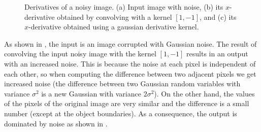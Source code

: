 \begin{figure}[h]
\centerline{
}
\caption{Derivatives of a noisy image. 
(a) Input image with noise, (b) its $x$-derivative obtained by convolving with a kernel $[1, -1]$, and (c) its $x$-derivative obtained using a gaussian derivative kernel.}
\label{fig:derivativesnoisystop}
\end{figure}

As shown in \fig{\ref{fig:derivativesnoisystop}}, the input is an image corrupted with Gaussian noise. The result of convolving the input noisy image with the kernel $[1, -1]$ results in an output with an increased noise. This is because the noise at each pixel is independent of each other, so when computing the difference between two adjacent pixels we get increased noise (the difference between two Gaussian random variables with variance $\sigma^2$ is a new Gaussian with variance $2\sigma^2$). On the other hand, the values of the  pixels of the original image are very similar and the difference is a small number (except at the object boundaries). As a consequence, the output is dominated by noise as shown in .

